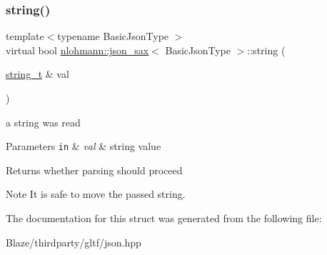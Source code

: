 \subsubsection{\texorpdfstring{string()}{string()}}
{\footnotesize\ttfamily template$<$typename Basic\+Json\+Type $>$ \\
virtual bool \hyperlink{structnlohmann_1_1json__sax}{nlohmann\+::json\+\_\+sax}$<$ Basic\+Json\+Type $>$\+::string (\begin{DoxyParamCaption}\item[{\hyperlink{structnlohmann_1_1json__sax_ae01977a9f3c5b3667b7a2929ed91061e}{string\+\_\+t} \&}]{val }\end{DoxyParamCaption})\hspace{0.3cm}{\ttfamily [pure virtual]}}



a string was read 


\begin{DoxyParams}[1]{Parameters}
\mbox{\tt in}  & {\em val} & string value \\
\hline
\end{DoxyParams}
\begin{DoxyReturn}{Returns}
whether parsing should proceed 
\end{DoxyReturn}
\begin{DoxyNote}{Note}
It is safe to move the passed string. 
\end{DoxyNote}


The documentation for this struct was generated from the following file\+:\begin{DoxyCompactItemize}
\item 
Blaze/thirdparty/gltf/json.\+hpp\end{DoxyCompactItemize}
